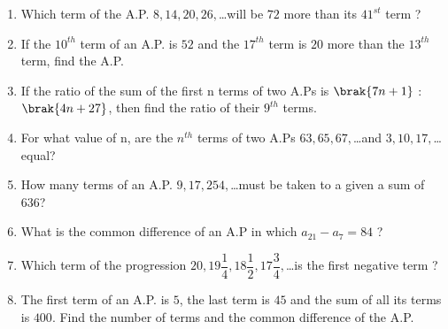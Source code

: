 \begin{enumerate}
\item Which term of the A.P. $8,14,20,26,$\ldots will be $72$ more than its $41^{st}$ term ?
\item If the $10^{th}$ term of an A.P. is $52$ and the $17^{th}$ term is $20$ more than the $13^{th}$ term, find the A.P.
\item If the ratio of the sum of the first n terms of two A.Ps is $\brak{7n + 1}$ : $\brak{4n + 27}$, then find the ratio of their $9^{th}$ terms.
\item For what value of n, are the $n^{th}$ terms of two A.Ps $63,65,67,$\ldots and $3,10,17,$\ldots equal?
\item How many terms of an A.P. $9,17,254,$\ldots must be taken to a given a sum of $636$?
\item What is the common difference of an A.P in which $a_{21} - a_7 = 84$ ?
\item Which term of the progression $20,19\dfrac{1}{4},18\dfrac{1}{2},17\dfrac{3}{4},$\ldots is the first negative term ?
\item The first term of an A.P. is $5$, the last term is $45$ and the sum of all its terms is $400$. Find the number of terms and the common difference of the A.P.
\end{enumerate}

